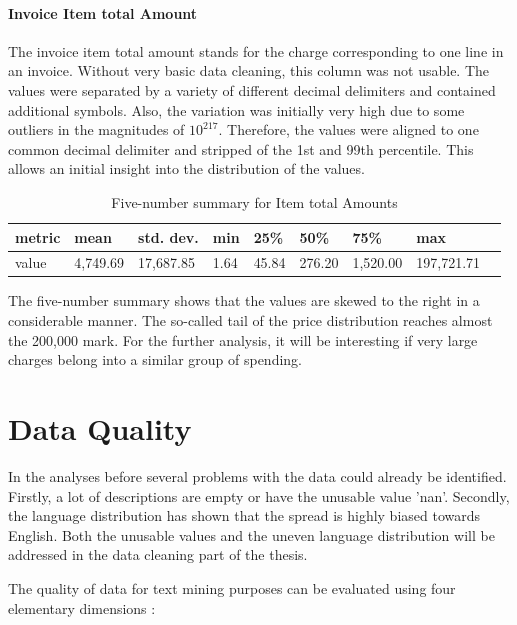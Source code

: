 \paragraph{Invoice Item total Amount}
The invoice item total amount stands for the charge corresponding to one line in an invoice. Without very basic data cleaning, this column was not usable. The values were separated by a variety of different decimal delimiters and contained additional symbols. Also, the variation was initially very high due to some outliers in the magnitudes of $10^{217}$. Therefore, the values were aligned to one common decimal delimiter and stripped of the 1st and 99th percentile. This allows an initial insight into the distribution of the values.

\begin{table}[!h]
	\caption{Five-number summary for Item total Amounts}
	\begin{tabular}{l|llllllll}
		\textbf{metric} &  \textbf{mean} & \textbf{std. dev.} & \textbf{min} & \textbf{25\%} & \textbf{50\%} & \textbf{75\%} & \textbf{max} \\
		\midrule
		value               & 4,749.69      & 17,687.85          & 1.64         & 45.84         & 276.20        & 1,520.00      & 197,721.71  
	\end{tabular}
\end{table}

The five-number summary shows that the values are skewed to the right in a considerable manner. The so-called tail of the price distribution reaches almost the 200,000 mark. For the further analysis, it will be interesting if very large charges belong into a similar group of spending.

\section{Data Quality}
In the analyses before several problems with the data could already be identified. Firstly, a lot of descriptions are empty or have the unusable value 'nan'. Secondly, the language distribution has shown that the spread is highly biased towards English. 
Both the unusable values and the uneven language distribution will be addressed in the data cleaning part of the thesis.

The quality of data for text mining purposes can be evaluated using four elementary dimensions \cite[p.~1279]{dataQualityAzeroual} :

